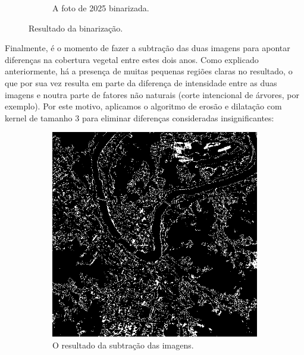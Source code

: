 \documentclass{article}
\begin{document}
\begin{figure}[H]
\begin{subfigure}[b]{0.48\textwidth}
        \caption{A foto de 2025 binarizada.}
        \label{2025}
    \end{subfigure}
    \caption{Resultado da binarização.}
    \label{binarizada}
\end{figure}

Finalmente, é o momento de fazer a subtração das duas imagens para apontar diferenças na cobertura vegetal entre estes dois anos. Como explicado anteriormente, há a presença de muitas pequenas regiões claras no resultado, o que por sua vez resulta em parte da diferença de intensidade entre as duas imagens e noutra parte de fatores não naturais (corte intencional de árvores, por exemplo). Por este motivo, aplicamos o algoritmo de erosão e dilatação com kernel de tamanho 3 para eliminar diferenças consideradas insignificantes:

\begin{figure}[H]
    \centering
    \begin{subfigure}[b]{0.48\textwidth}
        \includegraphics[width=\textwidth]{../Imagens/012025_sub.png}
        \caption{O resultado da subtração das imagens.}
        \label{2023}
    \end{subfigure}
    \hfill %
    \begin{subfigure}[b]{0.48\textwidth}

\end{subfigure}
\end{figure}
\end{document}
